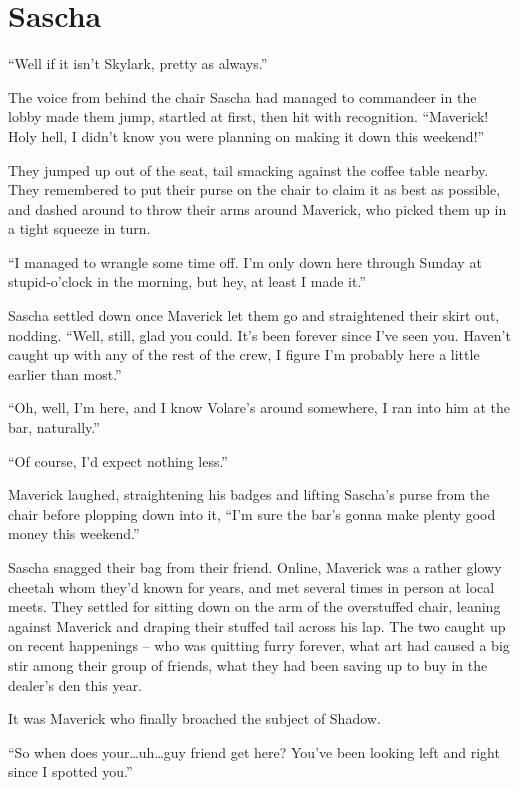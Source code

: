 \chapter{Sascha}

``Well if it isn't Skylark, pretty as always.''

The voice from behind the chair Sascha had managed to commandeer in the lobby made them jump, startled at first, then hit with recognition. ``Maverick! Holy hell, I didn't know you were planning on making it down this weekend!''

They jumped up out of the seat, tail smacking against the coffee table nearby.  They remembered to put their purse on the chair to claim it as best as possible, and dashed around to throw their arms around Maverick, who picked them up in a tight squeeze in turn.

``I managed to wrangle some time off. I'm only down here through Sunday at stupid-o'clock in the morning, but hey, at least I made it.''

Sascha settled down once Maverick let them go and straightened their skirt out, nodding. ``Well, still, glad you could. It's been forever since I've seen you. Haven't caught up with any of the rest of the crew, I figure I'm probably here a little earlier than most.''

``Oh, well, I'm here, and I know Volare's around somewhere, I ran into him at the bar, naturally.''

``Of course, I'd expect nothing less.''

Maverick laughed, straightening his badges and lifting Sascha's purse from the chair before plopping down into it, ``I'm sure the bar's gonna make plenty good money this weekend.''

Sascha snagged their bag from their friend. Online, Maverick was a rather glowy cheetah whom they'd known for years, and met several times in person at local meets. They settled for sitting down on the arm of the overstuffed chair, leaning against Maverick and draping their stuffed tail across his lap. The two caught up on recent happenings -- who was quitting furry forever, what art had caused a big stir among their group of friends, what they had been saving up to buy in the dealer's den this year.

It was Maverick who finally broached the subject of Shadow.

``So when does your\ldots{}uh\ldots{}guy friend get here? You've been looking left and right since I spotted you.''

